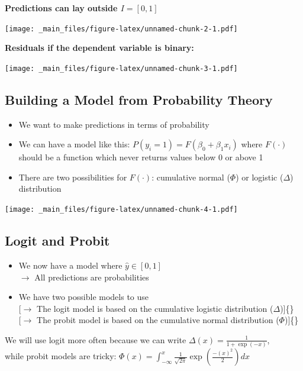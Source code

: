 \documentclass[]{article}
\providecommand{\tightlist}{%
  \setlength{\itemsep}{0pt}\setlength{\parskip}{0pt}}
\theoremstyle{definition}
\theoremstyle{definition}
\theoremstyle{remark}
\begin{document}
\textbf{Predictions can lay outside \(I=[0,1]\)}

\texttt{[image: \_main\_files/figure-latex/unnamed-chunk-2-1.pdf]}

\textbf{Residuals if the dependent variable is binary:}

\texttt{[image: \_main\_files/figure-latex/unnamed-chunk-3-1.pdf]}

\subsection{Building a Model from Probability
Theory}\label{building-a-model-from-probability-theory}

\begin{itemize}
\tightlist
\item
  We want to make predictions in terms of probability
\item
  We can have a model like this: \(P(y_i=1)={F(\beta_0 + \beta_1 x_i)}\)
  where \(F(\cdot)\) should be a function which never returns values
  below 0 or above 1
\item
  There are two possibilities for \(F(\cdot)\): cumulative normal
  (\(\Phi\)) or logistic (\(\Delta\)) distribution
\end{itemize}

\texttt{[image: \_main\_files/figure-latex/unnamed-chunk-4-1.pdf]}

\subsection{Logit and Probit}\label{logit-and-probit}

\begin{itemize}
\item
  We now have a model where \(\hat y \in [0,1]\)\\
  \(\rightarrow\) All predictions are probabilities
\item
  We have two possible models to use\\
  {[}\(\rightarrow\) The logit model is based on the cumulative logistic
  distribution (\(\Delta\)){]}\{\}\\
  {[}\(\rightarrow\) The probit model is based on the cumulative normal
  distribution (\(\Phi\)){]}\{\}
\end{itemize}

We will use logit more often because we can write
\(\Delta(x) = \frac{1}{1 + \exp(-x)}\),\\
while probit models are tricky:
\(\Phi(x) = \int_{-\infty}^{x}\frac{1}{\sqrt{2\pi}}\exp(\frac{-(x)^2}{2}) dx\)
\end{document}
